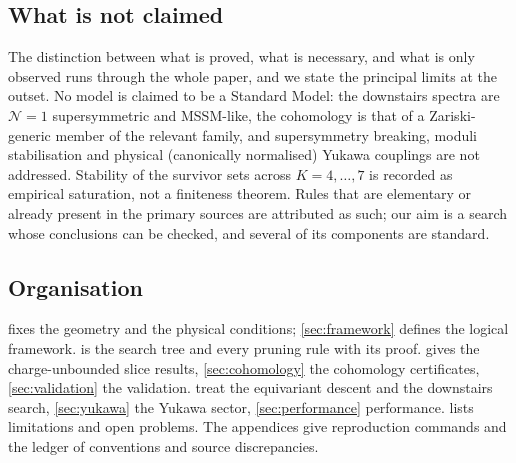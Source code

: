 \subsection{What is not claimed}

The distinction between what is proved, what is necessary, and what is only
observed runs through the whole paper, and we state the principal limits at the
outset. No model is claimed to be a Standard Model: the downstairs spectra are
$\mathcal N=1$ supersymmetric and MSSM-like, the cohomology is that of a
Zariski-generic member of the relevant family, and supersymmetry breaking,
moduli stabilisation and physical (canonically normalised) Yukawa couplings are
not addressed. Stability of the survivor sets across $K=4,\dots,7$ is recorded as
empirical saturation, not a finiteness theorem. Rules that are elementary or
already present in the primary sources are attributed as such; our aim is a
search whose conclusions can be checked, and several of its components are
standard.

\subsection{Organisation}

 fixes the geometry and the physical conditions;
\cref{sec:framework} defines the logical framework.  is the
search tree and every pruning rule with its proof.  gives the
charge-unbounded slice results, \cref{sec:cohomology} the cohomology
certificates, \cref{sec:validation} the validation. 
treat the equivariant descent and the downstairs search, \cref{sec:yukawa} the
Yukawa sector, \cref{sec:performance} performance.  lists
limitations and open problems. The appendices give reproduction commands and
the ledger of conventions and source discrepancies.
